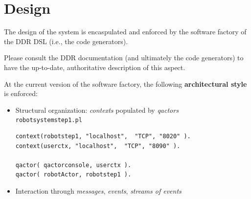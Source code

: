 \documentclass[11pt]{article}
\newcommand{\labelsec}[1]{\label{sec:#1}}
\begin{document}




\section{Design}
\labelsec{Design}

The design of the system is encaspulated and enforced by the software
  factory of the DDR DSL (i.e., the code generators).
  
Please consult the DDR documentation (and ultimately the code generators) 
  to have the up-to-date, authoritative description of this aspect.

At the current version of the software factory, the following
\textbf{architectural style} is enforced:

\begin{itemize}
  \item Structural organization: \emph{contexts} populated by \emph{qactors}\\
  \texttt{robotsystemstep1.pl}
  \begin{lstlisting}
context(robotstep1, "localhost",  "TCP", "8020" ).  		 
context(userctx, "localhost",  "TCP", "8090" ).  		 

qactor( qactorconsole, userctx ).
qactor( robotActor, robotstep1 ).
\end{lstlisting}
  
  \item Interaction through \emph{messages}, \emph{events},
  \emph{streams of events}
\end{itemize}





\end{document}
